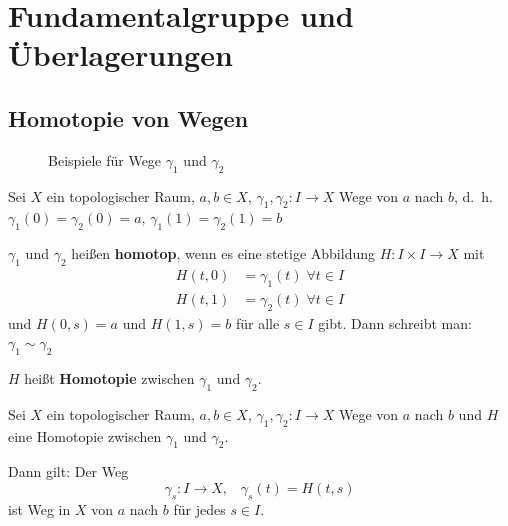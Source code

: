 \chapter{Fundamentalgruppe und Überlagerungen}
\section{Homotopie von Wegen}
\begin{figure}[ht]
    \centering
    \hspace{1em}%
    \label{fig:paths-homotop-example-counterexample}
    \caption{Beispiele für Wege $\gamma_1$ und $\gamma_2$}
\end{figure}

\begin{definition}%
    Sei $X$ ein topologischer Raum, $a, b \in X$, 
    $\gamma_1, \gamma_2: I \rightarrow X$ Wege von $a$ nach $b$,
    d.~h. $\gamma_1(0) = \gamma_2(0) = a$, $\gamma_1(1) = \gamma_2(1) = b$

    $\gamma_1$ und $\gamma_2$ heißen \textbf{homotop},
    wenn es eine stetige Abbildung $H : I \times I \rightarrow X$ mit
    \begin{align*}
        H(t,0) &= \gamma_1(t)\;\forall t \in I\\
        H(t,1) &= \gamma_2(t)\;\forall t \in I
    \end{align*}
    und $H(0,s) = a$ und $H(1,s) = b$ für alle $s \in I$ gibt.
    Dann schreibt man: $\gamma_1 \sim \gamma_2$

    $H$ heißt \textbf{Homotopie} zwischen
    $\gamma_1$ und $\gamma_2$.
\end{definition}

\begin{bemerkung}
    Sei $X$ ein topologischer Raum, $a, b \in X$, 
    $\gamma_1, \gamma_2: I \rightarrow X$ Wege von $a$ nach $b$
    und $H$ eine Homotopie zwischen $\gamma_1$ und $\gamma_2$.

    Dann gilt: Der Weg
    \[\gamma_s: I \rightarrow X,\;\;\;\gamma_s(t) = H(t,s)\]
    ist Weg in $X$ von $a$ nach $b$ für jedes $s \in I$.
\end{bemerkung}

